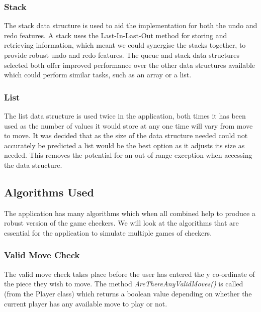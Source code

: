 \documentclass[10pt, a4paper]{article}
\begin{document}
    \subsubsection{Stack}
    The stack data structure is used to aid the 
    \newline
    implementation for both the undo and redo features. A stack uses the Last-In-Last-Out method for storing and 
    \newline
    retrieving information, which meant we could synergise the stacks together, to provide robust undo and redo 
    \newline
    features.
    \newline
    The queue and stack data structures selected both 
    \newline
    offer improved performance over the other data structures available which could perform similar tasks, such as an array or a list.
    
    \subsubsection{List}
    The list data structure is used twice in the application, both times it has been used as the number of values it would store at any one time will vary from move to move. It was decided that as the size of the data 
    \newline
    structure needed could not accurately be predicted a list would be the best option as it adjusts its size as needed. This removes the potential for an out of range exception when accessing the data structure.
    
    
    
    \subsection{Algorithms Used}
    The application has many algorithms which when all 
    \newline
    combined help to produce a robust version of the game checkers. We will look at the algorithms that are essential for the application to simulate multiple games of checkers.
    
    \subsubsection{Valid Move Check}
    The valid move check takes place before the user has entered the y co-ordinate of the piece they wish to move. The method \textit{AreThereAnyValidMoves()} is called (from the Player class) which returns a boolean value depending on whether the current player has any available move to play or not.   
    
\end{document}
